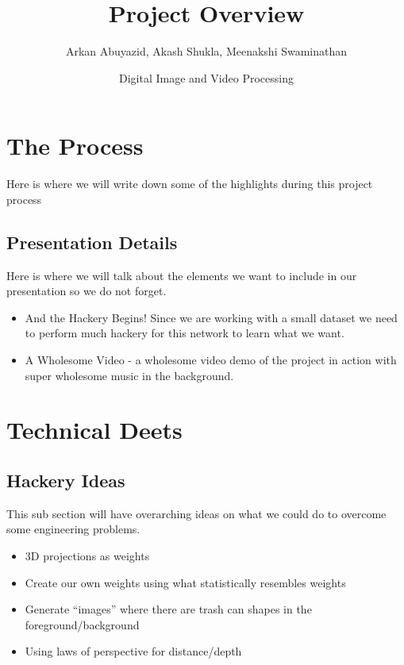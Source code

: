 \documentclass[12pt,letterpaper]{article}
\title{Project Overview}
\author{Arkan Abuyazid, Akash Shukla, Meenakshi Swaminathan}
\date{Digital Image and Video Processing}
\begin{document}
\maketitle

\section*{The Process}
Here is where we will write down some of the highlights during this project process
\subsection*{Presentation Details}
Here is where we will talk about the elements we want to include in our presentation so we do not forget.
\begin{itemize}
    \item And the Hackery Begins! Since we are working with a small dataset we need to perform much hackery for this network to learn what we want. 
    \item A Wholesome Video - a wholesome video demo of the project in action with super wholesome music in the background.
\end{itemize}
\section*{Technical Deets}
\subsection*{Hackery Ideas}
This sub section will have overarching ideas on what we could do to overcome some engineering problems.
\begin{itemize}
    \item 3D projections as weights
    \item Create our own weights using what statistically resembles weights
    \item Generate “images” where there are trash can shapes in the foreground/background

    \item Using laws of perspective for distance/depth
\end{itemize}
\end{document}
